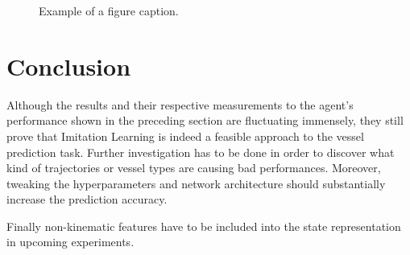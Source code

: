 \documentclass[conference]{IEEEtran}
\begin{document}
\begin{figure}[t]
\centering

\caption{Example of a figure caption.}
\label{fig:result}
\end{figure}
\section{Conclusion}
Although the results and their respective measurements to the agent's performance shown in the preceding section are fluctuating immensely, they still prove that Imitation Learning is indeed a feasible approach to the vessel prediction task. Further investigation has to be done in order to discover what kind of trajectories or vessel types are causing bad performances. Moreover, tweaking the hyperparameters and network architecture should substantially increase the prediction accuracy.
\par
Finally non-kinematic features have to be included into the state representation in upcoming experiments.



\end{document}
